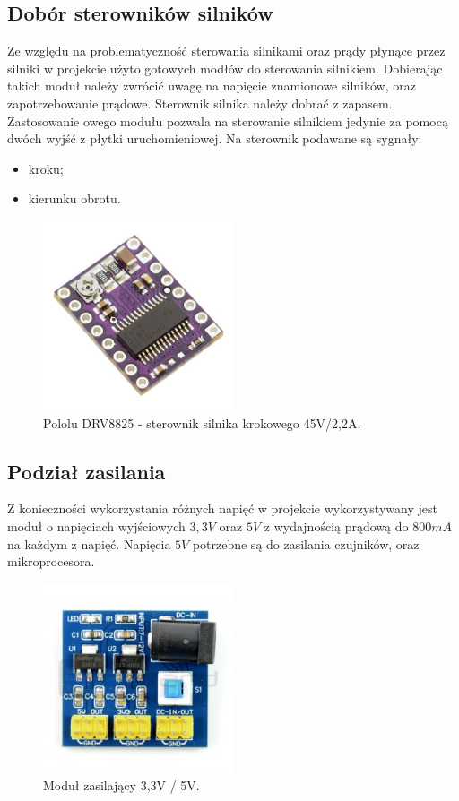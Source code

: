 \subsection{Dobór sterowników silników}
Ze względu na problematyczność sterowania silnikami oraz prądy płynące przez silniki w projekcie użyto gotowych modłów do sterowania silnikiem. Dobierając takich moduł należy zwrócić uwagę na napięcie znamionowe silników, oraz zapotrzebowanie prądowe. Sterownik silnika należy dobrać z zapasem. Zastosowanie owego modułu pozwala na sterowanie silnikiem jedynie za pomocą dwóch wyjść z płytki uruchomieniowej. Na sterownik podawane są sygnały:
\begin{itemize}
    \item kroku;
    \item kierunku obrotu.
\end{itemize}
\begin{figure}[H]
\centering
\includegraphics[width=0.5\textwidth]{inzynierku/img/sterownik.jpg}
\caption{\label{fig:sterownik_silnika}Pololu DRV8825 - sterownik silnika krokowego 45V/2,2A.}
\end{figure}

\subsection{Podział zasilania}
Z konieczności wykorzystania różnych napięć w projekcie wykorzystywany jest moduł o napięciach wyjściowych $3,3V$ oraz $5V$ z wydajnością prądową do $800mA$ na każdym z napięć. Napięcia $5V$ potrzebne są do zasilania czujników, oraz mikroprocesora.
\begin{figure}[H]
\centering
\includegraphics[width=0.5\textwidth]{inzynierku/img/zasilajacy.jpg}
\caption{\label{fig:modul_zasilajacy}Moduł zasilający 3,3V / 5V.}
\end{figure}

